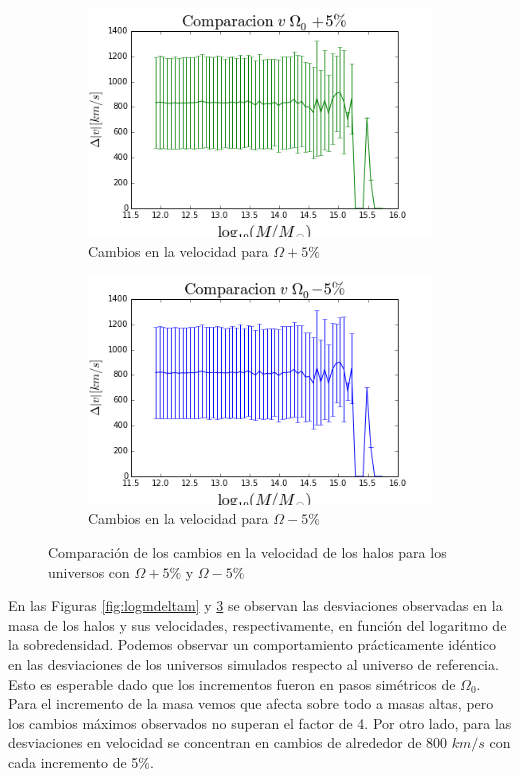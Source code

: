 \begin{figure}[h]
	\centering
	\begin{subfigure}[b]{0.49\textwidth}
		\includegraphics[width=\textwidth]{Trabajo/logm-deltav-mas}
		\caption{Cambios en la velocidad para $\Omega+5\%$}
		\label{fig:logmdeltavmas}
	\end{subfigure}
	\begin{subfigure}[b]{0.49\textwidth}
		\includegraphics[width=\textwidth]{Trabajo/logm-deltav-menos}
		\caption{Cambios en la velocidad para $\Omega-5\%$}
		\label{fig:logmdeltavmenos}
	\end{subfigure}
	\caption{Comparación de los cambios en la velocidad de los halos para los universos con $\Omega+5\%$ y $\Omega-5\%$}
	\label{fig:logmdeltav}
\end{figure}

En las Figuras \ref{fig:logmdeltam} y \ref{fig:logmdeltav} se observan las desviaciones observadas en la masa de los halos y sus velocidades, respectivamente, en función del logaritmo de la sobredensidad. Podemos observar un comportamiento prácticamente idéntico en las desviaciones de los universos simulados respecto al universo de referencia. Esto es esperable dado que los incrementos fueron en pasos simétricos de $\Omega_0$. Para el incremento de la masa vemos que afecta sobre todo a masas altas, pero los cambios máximos observados no superan el factor de 4. Por otro lado, para las desviaciones en velocidad se concentran en cambios de alrededor de 800 $km/s$ con cada incremento de 5$\%$.

